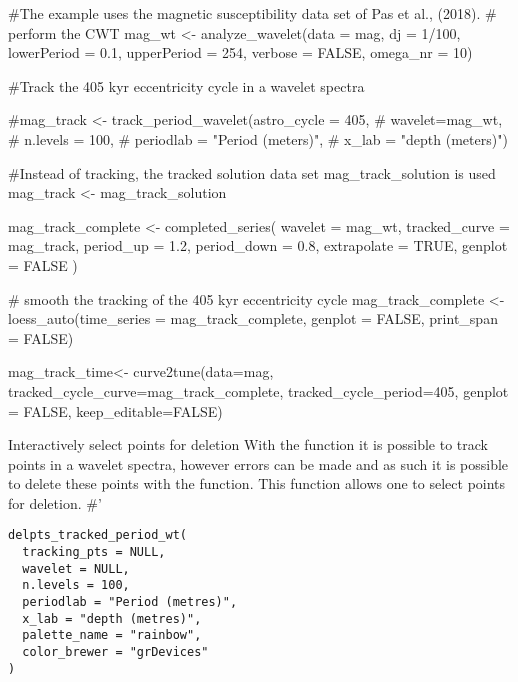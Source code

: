 \documentclass[a4paper]{book}
\begin{document}
\begin{Examples}
\begin{ExampleCode}

#The example uses the magnetic susceptibility data set of Pas et al., (2018).
# perform the CWT
mag_wt <- analyze_wavelet(data = mag,
dj = 1/100,
lowerPeriod = 0.1,
upperPeriod = 254,
verbose = FALSE,
omega_nr = 10)

#Track the 405 kyr eccentricity cycle in a wavelet spectra

#mag_track <- track_period_wavelet(astro_cycle = 405,
#                                   wavelet=mag_wt,
#                                   n.levels = 100,
#                                   periodlab = "Period (meters)",
#                                   x_lab = "depth (meters)")

#Instead of tracking, the tracked solution data set mag_track_solution is used
mag_track <- mag_track_solution

mag_track_complete <- completed_series(
  wavelet = mag_wt,
  tracked_curve = mag_track,
  period_up = 1.2,
  period_down = 0.8,
  extrapolate = TRUE,
  genplot = FALSE
)

# smooth the tracking of the 405 kyr eccentricity cycle
mag_track_complete <- loess_auto(time_series = mag_track_complete,
genplot = FALSE, print_span = FALSE)

mag_track_time<- curve2tune(data=mag,
                           tracked_cycle_curve=mag_track_complete,
                           tracked_cycle_period=405,
                           genplot = FALSE,
                           keep_editable=FALSE)

\end{ExampleCode}
\end{Examples}
%
\begin{Description}
Interactively select points for deletion
With the   function it is possible to track points in a wavelet spectra,
however errors can be made and as such it is possible to delete these points with the  function.
This function allows one to select points for deletion.
\#'
\end{Description}
%
\begin{Usage}
\begin{verbatim}
delpts_tracked_period_wt(
  tracking_pts = NULL,
  wavelet = NULL,
  n.levels = 100,
  periodlab = "Period (metres)",
  x_lab = "depth (metres)",
  palette_name = "rainbow",
  color_brewer = "grDevices"
)
\end{verbatim}
\end{Usage}
\end{document}
